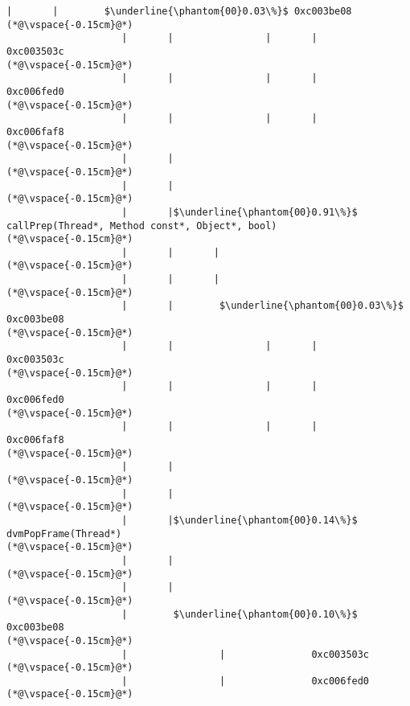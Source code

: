 \begin{lstlisting}[caption=20 viiteparametria (C$\to$Java) , label=profile:C2JBenchmark00206, numberbychapter=true, frame=lines, float, floatplacement=t]
                    |       |        $\underline{\phantom{00}0.03\%}$ 0xc003be08
(*@\vspace{-0.15cm}@*)
                    |       |                |       |               0xc003503c
(*@\vspace{-0.15cm}@*)
                    |       |                |       |               0xc006fed0
(*@\vspace{-0.15cm}@*)
                    |       |                |       |               0xc006faf8
(*@\vspace{-0.15cm}@*)
                    |       |
(*@\vspace{-0.15cm}@*)
                    |       |
(*@\vspace{-0.15cm}@*)
                    |       |$\underline{\phantom{00}0.91\%}$ callPrep(Thread*, Method const*, Object*, bool)
(*@\vspace{-0.15cm}@*)
                    |       |       |
(*@\vspace{-0.15cm}@*)
                    |       |       |
(*@\vspace{-0.15cm}@*)
                    |       |        $\underline{\phantom{00}0.03\%}$ 0xc003be08
(*@\vspace{-0.15cm}@*)
                    |       |                |       |               0xc003503c
(*@\vspace{-0.15cm}@*)
                    |       |                |       |               0xc006fed0
(*@\vspace{-0.15cm}@*)
                    |       |                |       |               0xc006faf8
(*@\vspace{-0.15cm}@*)
                    |       |
(*@\vspace{-0.15cm}@*)
                    |       |
(*@\vspace{-0.15cm}@*)
                    |       |$\underline{\phantom{00}0.14\%}$ dvmPopFrame(Thread*)
(*@\vspace{-0.15cm}@*)
                    |       |
(*@\vspace{-0.15cm}@*)
                    |       |
(*@\vspace{-0.15cm}@*)
                    |        $\underline{\phantom{00}0.10\%}$ 0xc003be08
(*@\vspace{-0.15cm}@*)
                    |                |               0xc003503c
(*@\vspace{-0.15cm}@*)
                    |                |               0xc006fed0
(*@\vspace{-0.15cm}@*)

\end{lstlisting}
